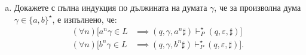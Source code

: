 \begin{extra}
\begin{example}
  \begin{enumerate}[a)]
  \item
    Докажете с пълна индукция по дължината на думата $\gamma$, че за произволна дума $\gamma \in \{a, b\}^\star$, е изпълнено, че:
    \begin{align}
      (\forall n)[a^n\gamma \in L & \implies (q, \gamma, a^n\sharp) \vdash^\star_P (q, \varepsilon, \sharp)] \label{eq:omega-ab:1}\\
      (\forall n)[b^n\gamma \in L & \implies (q, \gamma, b^n\sharp) \vdash^\star_P (q, \varepsilon, \sharp)]. \label{eq:omega-ab:2}
    \end{align}

    

\end{enumerate}
\end{example}
\end{extra}
